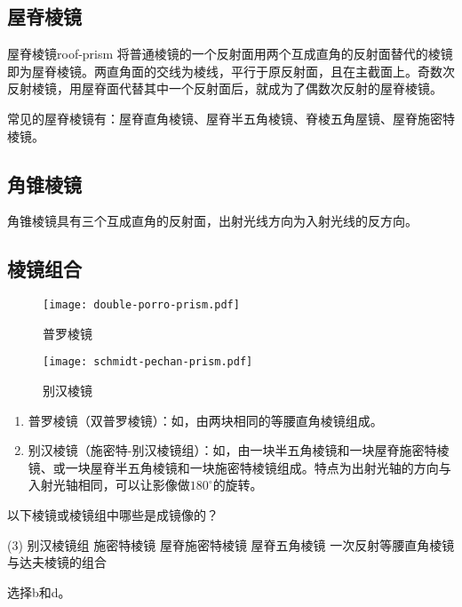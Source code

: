 \documentclass[cn,10pt,chinesefont=founder,math=newtx,cite=super,twoside]{elegantbook}
\begin{document}
\subsection{屋脊棱镜}

\begin{definition}{屋脊棱镜}{roof-prism}
	将普通棱镜的一个反射面用两个互成直角的反射面替代的棱镜即为屋脊棱镜。两直角面的交线为棱线，平行于原反射面，且在主截面上。奇数次反射棱镜，用屋脊面代替其中一个反射面后，就成为了偶数次反射的屋脊棱镜。
\end{definition}

常见的屋脊棱镜有：屋脊直角棱镜、屋脊半五角棱镜、脊棱五角屋镜、屋脊施密特棱镜。

\subsection{角锥棱镜}
角锥棱镜具有三个互成直角的反射面，出射光线方向为入射光线的反方向。

\subsection{棱镜组合}

\begin{figure}[htbp]
	\centering
	\begin{minipage}[t]{0.45\textwidth}
		\centering
		\texttt{[image: double-porro-prism.pdf]}
		\caption{普罗棱镜}
		\label{fig:double-porro-prism}
	\end{minipage}
	\qquad
	\begin{minipage}[t]{0.45\textwidth}
		\centering
		\texttt{[image: schmidt-pechan-prism.pdf]}
		\caption{别汉棱镜}
		\label{fig:schmidt-pechan-prism}
	\end{minipage}
\end{figure}

\begin{enumerate}
	\item 普罗棱镜（双普罗棱镜）：如，由两块相同的等腰直角棱镜组成。
	\item 别汉棱镜（施密特-别汉棱镜组）：如，由一块半五角棱镜和一块屋脊施密特棱镜、或一块屋脊半五角棱镜和一块施密特棱镜组成。特点为出射光轴的方向与入射光轴相同，可以让影像做$180^{\circ}$的旋转。
\end{enumerate}

\begin{problem}
	以下棱镜或棱镜组中哪些是成镜像的？
	\begin{tasks}(3)
		\task 别汉棱镜组
		\task 施密特棱镜
		\task 屋脊施密特棱镜
		\task 屋脊五角棱镜
		\task* 一次反射等腰直角棱镜与达夫棱镜的组合
	\end{tasks}
\end{problem}
\begin{solution}
	选择b和d。
\end{solution}
\end{document}
